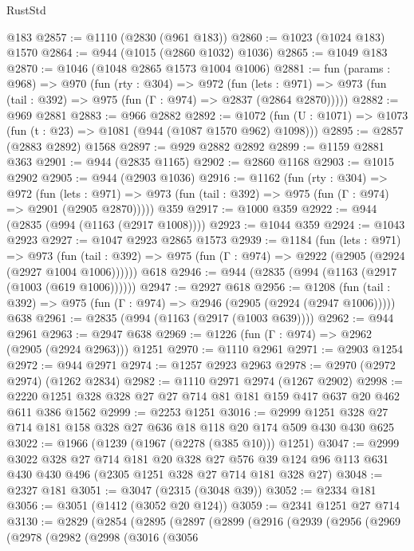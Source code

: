 \begin{lexlean}{RustStd}
\begin{coremodule}
    @183
@2857 := @1110 (@2830 (@961 @183))
@2860 := @1023 (@1024 @183) @1570
@2864 := @944 (@1015 (@2860 @1032) @1036)
@2865 := @1049 @183
@2870 := @1046 (@1048 @2865 @1573 @1004 @1006)
@2881 := fun (params : @968) =>
  @970
    (fun (rty : @304) =>
    @972
      (fun (lets : @971) =>
      @973 (fun (tail : @392) => @975 (fun (Γ : @974) => @2837 (@2864 @2870)))))
@2882 := @969 @2881
@2883 := @966 @2882
@2892 := @1072 (fun (U : @1071) => @1073 (fun (t : @23) => @1081 (@944 (@1087 @1570 @962) @1098)))
@2895 := @2857 (@2883 @2892) @1568
@2897 := @929 @2882 @2892
@2899 := @1159 @2881 @363
@2901 := @944 (@2835 @1165)
@2902 := @2860 @1168
@2903 := @1015 @2902
@2905 := @944 (@2903 @1036)
@2916 := @1162
    (fun (rty : @304) =>
    @972
      (fun (lets : @971) =>
      @973 (fun (tail : @392) => @975 (fun (Γ : @974) => @2901 (@2905 @2870)))))
    @359
@2917 := @1000 @359
@2922 := @944 (@2835 (@994 (@1163 (@2917 @1008))))
@2923 := @1044 @359
@2924 := @1043 @2923
@2927 := @1047 @2923 @2865 @1573
@2939 := @1184
    (fun (lets : @971) =>
    @973 (fun (tail : @392) => @975 (fun (Γ : @974) => @2922 (@2905 (@2924 (@2927 @1004 @1006))))))
    @618
@2946 := @944 (@2835 (@994 (@1163 (@2917 (@1003 (@619 @1006))))))
@2947 := @2927 @618
@2956 := @1208
    (fun (tail : @392) => @975 (fun (Γ : @974) => @2946 (@2905 (@2924 (@2947 @1006)))))
    @638
@2961 := @2835 (@994 (@1163 (@2917 (@1003 @639))))
@2962 := @944 @2961
@2963 := @2947 @638
@2969 := @1226 (fun (Γ : @974) => @2962 (@2905 (@2924 @2963))) @1251
@2970 := @1110 @2961
@2971 := @2903 @1254
@2972 := @944 @2971
@2974 := @1257 @2923 @2963
@2978 := @2970 (@2972 @2974) (@1262 @2834)
@2982 := @1110 @2971 @2974 (@1267 @2902)
@2998 := @2220 @1251 @328 @328 @27 @27 @714 @81 @181 @159 @417 @637 @20 @462 @611 @386 @1562
@2999 := @2253 @1251
@3016 := @2999 @1251 @328 @27 @714 @181 @158 @328 @27 @636 @18 @118 @20 @174 @509 @430 @430 @625
@3022 := @1966 (@1239 (@1967 (@2278 (@385 @10))) @1251)
@3047 := @2999
    @3022
    @328
    @27
    @714
    @181
    @20
    @328
    @27
    @576
    @39
    @124
    @96
    @113
    @631
    @430
    @430
    @496
    (@2305 @1251 @328 @27 @714 @181 @328 @27)
@3048 := @2327 @181
@3051 := @3047 (@2315 (@3048 @39))
@3052 := @2334 @181
@3056 := @3051 (@1412 (@3052 @20 @124))
@3059 := @2341 @1251 @27 @714
@3130 := @2829
    (@2854
      (@2895
        (@2897
          (@2899
            (@2916
              (@2939
                (@2956
                  (@2969
                    (@2978
                      (@2982
                        (@2998
                          (@3016
                            (@3056

\end{coremodule}
\end{lexlean}
